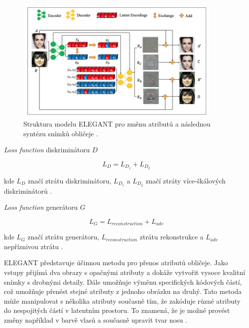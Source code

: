 \begin{figure}[H]
	\centering
	\includegraphics[width=0.9\textwidth]{obrazky-figures/schemeElegant.png}
	\caption{Struktura modelu ELEGANT pro změnu atributů a následnou syntézu snímků obličeje \cite{elegant-scheme}.}
        \label{fig:elegant}
\end{figure}

\noindent \textit{Loss function} diskriminátoru $D$

\begin{equation}
    L_{D} =L_{D_{1}} +L_{D_{2}}
    \label{eq:ELEGANTDis}
\end{equation}

kde $L_D$ značí ztrátu diskriminátoru, $L_{D_{1}}$ a $L_{D_{2}}$ značí ztráty více-škálových diskriminátorů \cite{elegant-scheme}.

\bigskip

\noindent \textit{Loss function} generátoru $G$

\begin{equation}
    L_{G} =L_{reconstruction} +L_{adv}
    \label{eq:ELEGANTGen}
\end{equation}

kde $L_{G}$ značí ztrátu generátoru, $L_{reconstruction}$ ztrátu rekonstrukce a $L_{adv}$ nepříznivou ztrátu \cite{elegant-scheme}.

\bigskip

\noindent ELEGANT představuje účinnou metodu pro přenos atributů obličeje. Jako vstupy přijímá dva obrazy s opačnými atributy a dokáže vytvořit vysoce kvalitní snímky s drobnými detaily. Dále umožňuje výměnu specifických kódových částí, což umožňuje přenést stejné atributy z jednoho obrázku na druhý. Tato metoda může manipulovat s několika atributy současně tím, že zakóduje různé atributy do nespojitých částí v latentním prostoru. To znamená, že je možné provést změny například v barvě vlasů a současně upravit tvar nosu \cite{reviewGANs}.

